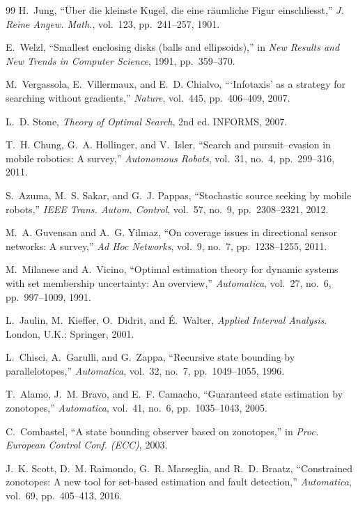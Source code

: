 \documentclass[journal,10pt]{IEEEtran}
\theoremstyle{definition}
\begin{document}
\begin{thebibliography}{99}
H.~Jung, ``\"Uber die kleinste Kugel, die eine r\"aumliche Figur einschliesst,''
\emph{J. Reine Angew. Math.}, vol.~123, pp.~241--257, 1901.

E.~Welzl, ``Smallest enclosing disks (balls and ellipsoids),'' in \emph{New Results and New
Trends in Computer Science}, 1991, pp.~359--370.

M.~Vergassola, E.~Villermaux, and E.~D. Chialvo, ```Infotaxis' as a strategy for searching
without gradients,'' \emph{Nature}, vol.~445, pp.~406--409, 2007.

L.~D. Stone, \emph{Theory of Optimal Search}, 2nd ed. INFORMS, 2007.

T.~H. Chung, G.~A. Hollinger, and V.~Isler, ``Search and pursuit--evasion in mobile robotics: A
survey,'' \emph{Autonomous Robots}, vol.~31, no.~4, pp.~299--316, 2011.

S.~Azuma, M.~S. Sakar, and G.~J. Pappas, ``Stochastic source seeking by mobile robots,''
\emph{IEEE Trans. Autom. Control}, vol.~57, no.~9, pp.~2308--2321, 2012.

M.~A. Guvensan and A.~G. Yilmaz, ``On coverage issues in directional sensor networks: A survey,''
\emph{Ad Hoc Networks}, vol.~9, no.~7, pp.~1238--1255, 2011.

M.~Milanese and A.~Vicino, ``Optimal estimation theory for dynamic systems with set membership
uncertainty: An overview,'' \emph{Automatica}, vol.~27, no.~6, pp.~997--1009, 1991.

L.~Jaulin, M.~Kieffer, O.~Didrit, and \'E.~Walter, \emph{Applied Interval Analysis}.
London, U.K.: Springer, 2001.

L.~Chisci, A.~Garulli, and G.~Zappa, ``Recursive state bounding by parallelotopes,''
\emph{Automatica}, vol.~32, no.~7, pp.~1049--1055, 1996.

T.~Alamo, J.~M. Bravo, and E.~F. Camacho, ``Guaranteed state estimation by zonotopes,''
\emph{Automatica}, vol.~41, no.~6, pp.~1035--1043, 2005.

C.~Combastel, ``A state bounding observer based on zonotopes,'' in \emph{Proc. European Control
Conf. (ECC)}, 2003.

J.~K. Scott, D.~M. Raimondo, G.~R. Marseglia, and R.~D. Braatz, ``Constrained zonotopes: A new
tool for set-based estimation and fault detection,'' \emph{Automatica}, vol.~69, pp.~405--413,
2016.


\end{thebibliography}
\end{document}
